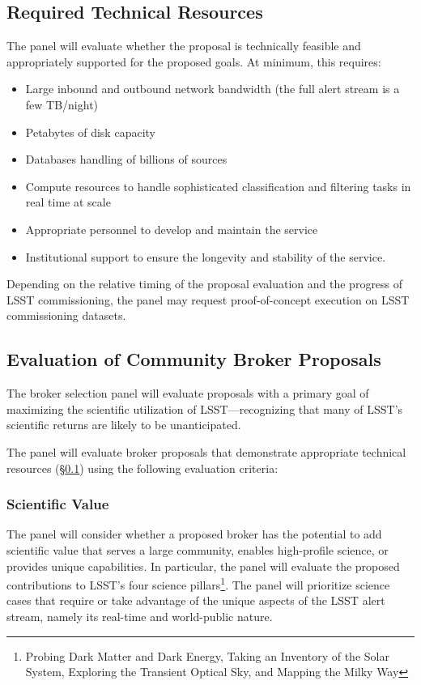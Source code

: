 \subsection{Required Technical Resources} \label{sec:resources}

The panel will evaluate whether the proposal is technically feasible and appropriately supported for the proposed goals.  
At minimum, this requires:

\begin{itemize}
	\item Large inbound and outbound network bandwidth (the full alert stream is a few TB/night)
	\item Petabytes of disk capacity
	\item Databases handling of billions of sources
	\item Compute resources to handle sophisticated classification and filtering tasks in real time at scale
	\item Appropriate personnel to develop and maintain the service
	\item Institutional support to ensure the longevity and stability of the service.
\end{itemize}

Depending on the relative timing of the proposal evaluation and the progress of LSST commissioning, the panel may request proof-of-concept execution on LSST commissioning datasets.

\subsection{Evaluation of Community Broker Proposals} \label{sec:evaluation}

The broker selection panel will evaluate proposals with a primary goal of maximizing the scientific utilization of LSST---recognizing that many of LSST's scientific returns are likely to be unanticipated.

The panel will evaluate broker proposals that demonstrate appropriate technical resources (\S \ref{sec:resources}) using the following evaluation criteria:

\subsubsection{Scientific Value}

The panel will consider whether a proposed broker has the potential to add scientific value that serves a large community, enables high-profile science, or provides unique capabilities.
In particular, the panel will evaluate the proposed contributions to LSST's four science pillars\footnote{Probing Dark Matter and Dark Energy, Taking an Inventory of the Solar System, Exploring the Transient Optical Sky, and Mapping the Milky Way}.
The panel will prioritize science cases that require or take advantage of the unique aspects of the LSST alert stream, namely its real-time and world-public nature.

